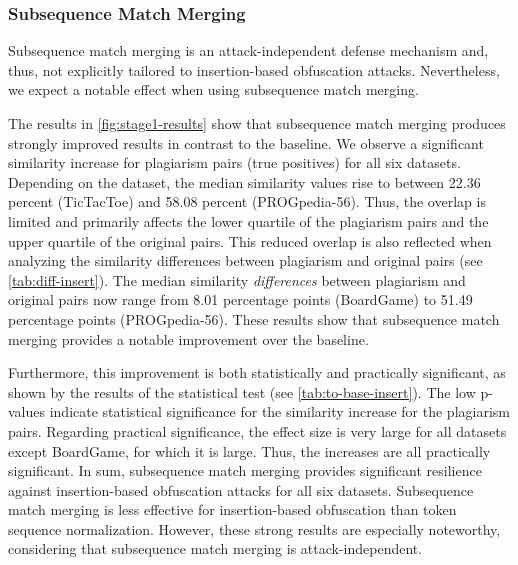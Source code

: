 \subsubsection{Subsequence Match Merging}
Subsequence match merging is an attack-independent defense mechanism and, thus, not explicitly tailored to insertion-based obfuscation attacks. Nevertheless, we expect a notable effect when using subsequence match merging.

The results in \autoref{fig:stage1-results} show that subsequence match merging produces strongly improved results in contrast to the baseline.
We observe a significant similarity increase for plagiarism pairs (true positives) for all six datasets.
Depending on the dataset, the median similarity values rise to between 22.36 percent (TicTacToe) and 58.08 percent (PROGpedia-56).
Thus, the overlap is limited and primarily affects the lower quartile of the plagiarism pairs and the upper quartile of the original pairs.
This reduced overlap is also reflected when analyzing the similarity differences between plagiarism and original pairs (see \autoref{tab:diff-insert}).
The median similarity \textit{differences} between plagiarism and original pairs now range from 8.01 percentage points (BoardGame) to 51.49 percentage points (PROGpedia-56).
These results show that subsequence match merging provides a notable improvement over the baseline. 

Furthermore, this improvement is both statistically and practically significant, as shown by the results of the statistical test (see \autoref{tab:to-base-insert}).
The low p-values indicate statistical significance for the similarity increase for the plagiarism pairs.
Regarding practical significance, the effect size is very large for all datasets except BoardGame, for which it is large. Thus, the increases are all practically significant.
In sum, subsequence match merging provides significant resilience against insertion-based obfuscation attacks for all six datasets.
Subsequence match merging is less effective for insertion-based obfuscation than token sequence normalization.
However, these strong results are especially noteworthy, considering that subsequence match merging is attack-independent.


